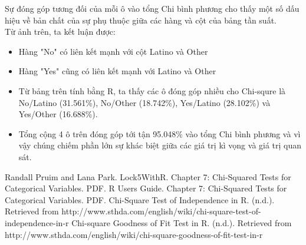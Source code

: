 \documentclass[a4paper,12pt]{article}
\begin{document}
	Sự đóng góp tương đối của mỗi ô vào tổng Chi bình phương cho thấy một số dấu hiệu về bản chất của sự phụ thuộc giữa các hàng và cột của bảng tần suất.\\
	
	Từ ảnh trên, ta kết luận được:
	\begin{itemize}
		\item Hàng "No" có liên kết mạnh với cột Latino và Other
		\item Hàng "Yes" cũng có liên kết mạnh với Latino và Other
		\item Từ bảng trên tính bằng R, ta thấy các ô đóng góp nhiều cho Chi-squre là No/Latino (31.561\%), No/Other (18.742\%), Yes/Latino (28.102\%) và Yes/Other (16.688\%).
		\item Tổng cộng 4 ô trên đóng góp tới tận 95.048\% vào tổng Chi bình phương và vì vậy chúng chiếm phần lớn sự khác biệt giữa các giá trị kì vọng và giá trị quan sát.
	\end{itemize}
	
	\begin{thebibliography}{00}
		 Randall Pruim and Lana Park. Lock5WithR. Chapter 7: Chi-Squared Tests for Categorical Variables. PDF.
		 R Users Guide. Chapter 7: Chi-Squared Tests for Categorical Variables. PDF.
		 Chi-Square Test of Independence in R. (n.d.). Retrieved from http://www.sthda.com/english/wiki/chi-square-test-of-independence-in-r
		 Chi-square Goodness of Fit Test in R. (n.d.). Retrieved from http://www.sthda.com/english/wiki/chi-square-goodness-of-fit-test-in-r
	\end{thebibliography}
\end{document}
